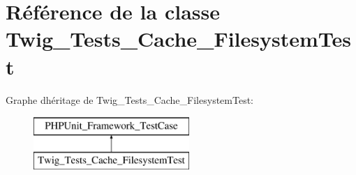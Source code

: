 \hypertarget{class_twig___tests___cache___filesystem_test}{}\section{Référence de la classe Twig\+\_\+\+Tests\+\_\+\+Cache\+\_\+\+Filesystem\+Test}
\label{class_twig___tests___cache___filesystem_test}
Graphe d\textquotesingle{}héritage de Twig\+\_\+\+Tests\+\_\+\+Cache\+\_\+\+Filesystem\+Test\+:\begin{figure}[H]
\begin{center}
\leavevmode
\includegraphics[height=2.000000cm]{class_twig___tests___cache___filesystem_test}
\end{center}
\end{figure}
